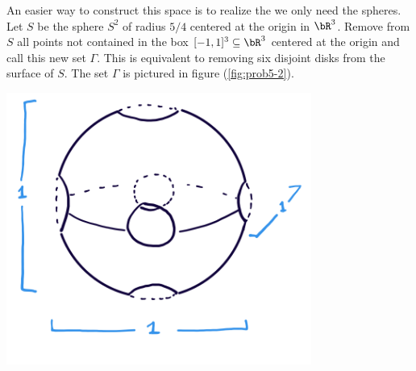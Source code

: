 \begin{homework}[e]
\begin{prf}
    An easier way to construct this space is to realize the we only need the spheres. Let $S$ be the sphere $S^2$ of radius $5/4$ centered at the origin in $\bR^3$. Remove from $S$ all points not contained in the box $[-1,1]^3\subseteq \bR^3$ centered at the origin and call this new set $\Gamma$. This is equivalent to removing six disjoint disks from the surface of $S$. The set $\Gamma$ is pictured in figure (\ref{fig:prob5-2}).
    \begin{center}
      \includegraphics[width=10cm]{figures/hwk6-fig7.png}
      \label{fig:prob5-2}
    \end{center}


\end{prf}
\end{homework}
